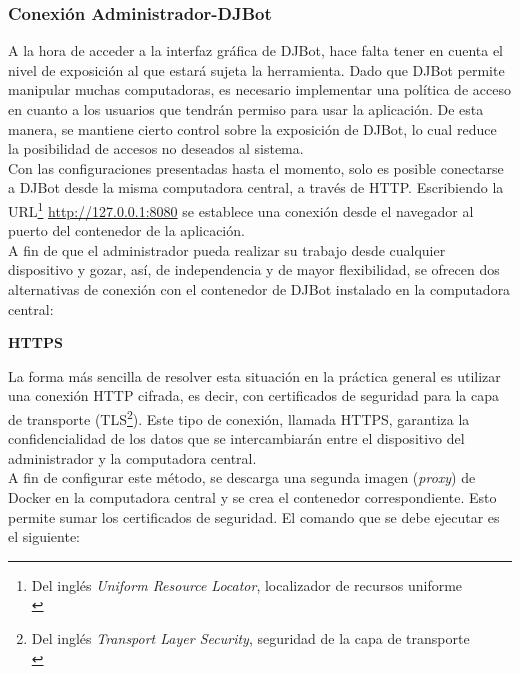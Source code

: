 \documentclass[a4paper,12pt]{article}
\begin{document}
\subsubsection{Conexión Administrador-DJBot}
\label{sec:orgheadline24}

A la hora de acceder a la interfaz gráfica de DJBot, hace falta tener en cuenta el nivel de exposición al que estará sujeta la herramienta. Dado que DJBot permite manipular muchas computadoras, es necesario implementar una política de acceso en cuanto a los usuarios que tendrán permiso para usar la aplicación. De esta manera, se mantiene cierto control sobre la exposición de DJBot, lo cual reduce la posibilidad de accesos no deseados al sistema.\\

Con las configuraciones presentadas hasta el momento, solo es posible conectarse a DJBot desde la misma computadora central, a través de HTTP. Escribiendo la URL\footnote{Del inglés \emph{Uniform Resource Locator}, localizador de recursos uniforme\\} \url{http://127.0.0.1:8080} se establece una conexión desde el navegador al puerto del contenedor de la aplicación.\\

A fin de que el administrador pueda realizar su trabajo desde cualquier dispositivo y gozar, así, de independencia y de mayor flexibilidad, se ofrecen dos alternativas de conexión con el contenedor de DJBot instalado en la computadora central:\\

\item\textbf{HTTPS}
\label{sec:orgheadline22}

La forma más sencilla de resolver esta situación en la práctica general es utilizar una conexión HTTP cifrada, es decir, con certificados de seguridad para la capa de transporte (TLS\footnote{Del inglés \emph{Transport Layer Security}, seguridad de la capa de transporte\\}). Este tipo de conexión, llamada HTTPS, garantiza la confidencialidad de los datos que se intercambiarán entre el dispositivo del administrador y la computadora central.\\

A fin de configurar este método, se descarga una segunda imagen (\emph{proxy}) de Docker en la computadora central y se crea el contenedor correspondiente. Esto permite sumar los certificados de seguridad. El comando que se debe ejecutar es el siguiente:
\end{document}
